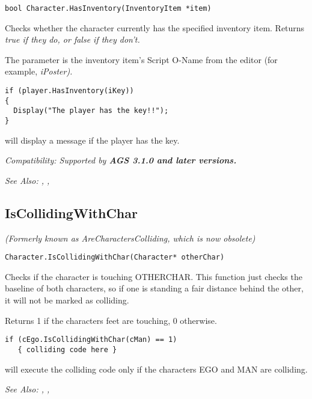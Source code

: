 \begin{verbatim}
bool Character.HasInventory(InventoryItem *item)
\end{verbatim}
Checks whether the character currently has the specified inventory item.
Returns \it{true} if they do, or \it{false} if they don't.

The parameter is the inventory item's Script O-Name from the editor (for
example, \it{iPoster}).

\begin{verbatim}
if (player.HasInventory(iKey))
{
  Display("The player has the key!!");
}
\end{verbatim}
will display a message if the player has the key.

\it{Compatibility:} Supported by \bf{AGS 3.1.0} and later versions.

\it{See Also:} ,
,



\subsection{IsCollidingWithChar}\label{Character.IsCollidingWithChar}%

\it{(Formerly known as AreCharactersColliding, which is now obsolete)}

\begin{verbatim}
Character.IsCollidingWithChar(Character* otherChar)
\end{verbatim}
Checks if the character is touching OTHERCHAR. This function just checks
the baseline of both characters, so if one is standing a fair distance behind
the other, it will not be marked as colliding.

Returns 1 if the characters feet are touching, 0 otherwise.

\begin{verbatim}
if (cEgo.IsCollidingWithChar(cMan) == 1)
   { colliding code here }
\end{verbatim}
will execute the colliding code only if the characters EGO and MAN are colliding.

\it{See Also:} ,
,


